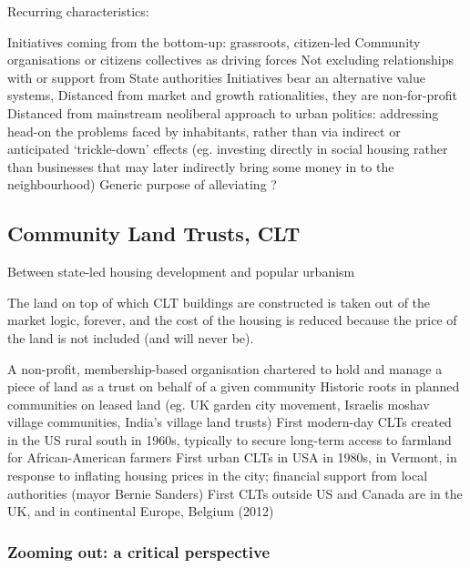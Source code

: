 \documentclass{article}
\begin{document}
Recurring characteristics:

\begin{outline}
	\1 Initiatives coming from the bottom-up: grassroots, citizen-led
		\2 Community organisations or citizens collectives as driving forces
		\2 Not excluding relationships with or support from State authorities
	\1 Initiatives bear an alternative value systems, 
		\2 Distanced from market and growth rationalities, they are non-for-profit
		\2 Distanced from mainstream neoliberal approach to urban politics: addressing head-on the problems faced by inhabitants, rather than via indirect or anticipated `trickle-down' effects (eg. investing directly in social housing rather than businesses that may later indirectly bring some money in to the neighbourhood)
	\1 Generic purpose  of alleviating ?
\end{outline}

\subsection{Community Land Trusts, CLT}

Between state-led housing development and popular urbanism

The land on top of which CLT buildings are constructed is taken out of the market logic, forever, and the cost of the housing is reduced because the price of the land is not included (and will never be).

\begin{outline}
	\1 A non-profit, membership-based organisation chartered to hold and manage a piece of land as a trust on behalf of a given community
	\1 Historic roots in planned communities on leased land (eg. UK garden city movement, Israelis moshav village communities, India's village land trusts)
	\1 First modern-day CLTs created in the US rural south in 1960s, typically to secure long-term access to farmland for African-American farmers
	\1 First urban CLTs in USA in 1980s, in Vermont, in response to inflating housing prices in the city; financial support from local authorities (mayor Bernie Sanders)
	\1 First CLTs outside US and Canada are in the UK, and in continental Europe, Belgium (2012)
\end{outline}

\subsubsection{Zooming out: a critical perspective}
\end{document}
